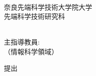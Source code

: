 \renewcommand\thepage{Title1}
\thispagestyle{empty}
\vspace*{9truemm}
\begin{center}
    \Large\bfseries\jdoctitle
\end{center}
\vspace*{27truemm}
\begin{center}
    \Large\bfseries\jtitle
\end{center}
\vspace*{40truemm}
\begin{center}
  {\Large\bfseries\jauthor} \\
  奈良先端科学技術大学院大学 \\
  先端科学技術研究科 \\
  \jprogram \\
\end{center}
\begin{center}
  主指導教員: \firstcmember \\
  \jlabname（情報科学領域）
\end{center}
\vspace*{5truemm}
\begin{center}
  \jdate 提出
\end{center}
\vspace*{\fill}
